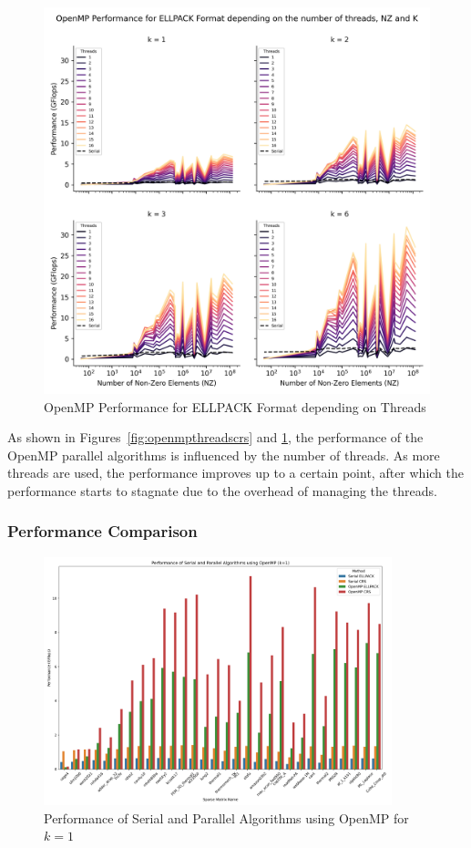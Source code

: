 \documentclass[12pt,oneside]{book} %
\begin{document}
\begin{figure}[H]
    \centering
    \includegraphics[width=0.6 \textwidth]{../results/images/openMP_Threads_ELLPACK.png}
    \caption{OpenMP Performance for ELLPACK Format depending on Threads}
    \label{fig:openmpthreadsellpack}
\end{figure}

As shown in Figures~\ref{fig:openmpthreadscrs} and
\ref{fig:openmpthreadsellpack}, the performance of the OpenMP parallel
algorithms is influenced by the number of threads. As more threads are used,
the performance improves up to a certain point, after which the performance
starts to stagnate due to the overhead of managing the threads.

\subsubsection{Performance Comparison}
\begin{figure}[H]
    \centering
    \includegraphics[width=0.9\textwidth]{../results/images/openMP_Performance_k1.png}
    \caption{Performance of Serial and Parallel Algorithms using OpenMP for $k=1$}
    \label{fig:openmp-performance-k1}
\end{figure}
\end{document}
